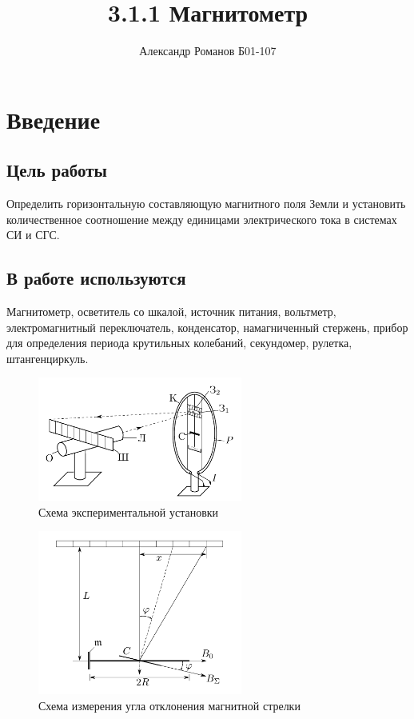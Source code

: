 \documentclass{article}
\author{Александр Романов Б01-107}
\date{}
\title{3.1.1 Магнитометр}
\begin{document}
\maketitle
\section{Введение}
\subsection{Цель работы}
Определить горизонтальную составляющую магнитного поля Земли и установить количественное соотношение между
единицами электрического тока в системах СИ и СГС.
\subsection{В работе используются}
Магнитометр, осветитель со шкалой, источ­ник питания, вольтметр, электромагнитный переключатель, конденсатор,
намагниченный стержень, прибор для определения периода крутильных
колебаний, секундомер, рулетка, штангенциркуль.
\begin{figure}[h]
    \centering
    \includegraphics[width=0.6\textwidth]{scheme.png}
    \caption{Схема экспериментальной установки}
    \label{fig:sheme}
\end{figure}

\begin{figure}[h]
    \centering
    \includegraphics[width=0.6\textwidth]{angles.png}
    \caption{Схема измерения угла отклонения магнитной стрелки}
    \label{fig:sheme}
\end{figure}
\end{document}

